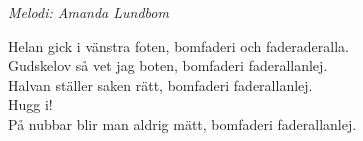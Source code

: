 {\footnotesize\textit{Melodi: Amanda Lundbom}}\par
\vspace{10pt}
Helan gick i vänstra foten, bomfaderi och faderaderalla.\\
Gudskelov så vet jag boten, bomfaderi faderallanlej.\\
Halvan ställer saken rätt, bomfaderi faderallanlej.\\
Hugg i!\\
På nubbar blir man aldrig mätt, bomfaderi faderallanlej.